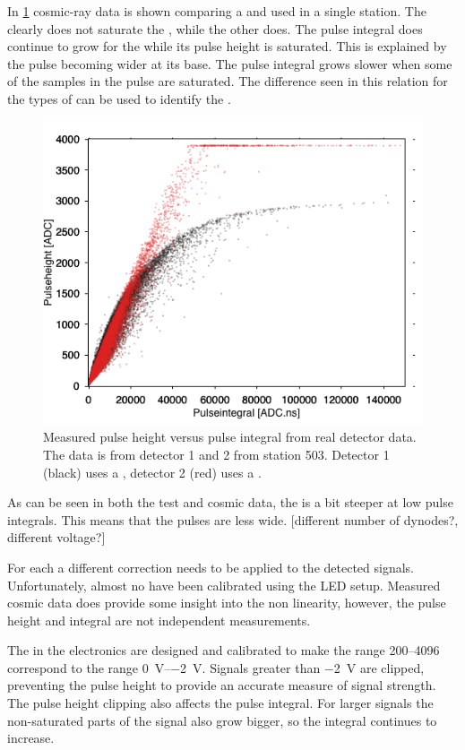 In \cref{fig:ph_pi_503} cosmic-ray data is shown comparing a \nikhef and \senstech \pmt used in a single station. The \senstech \pmt clearly does not saturate the \adcs, while the other does. The pulse integral does continue to grow for the \nikhef \pmt while its pulse height is saturated. This is explained by the pulse becoming wider at its base. The pulse integral grows slower when some of the samples in the pulse are saturated. The difference seen in this relation for the types of \pmts can be used to identify the \pmt.

\begin{figure}
    \centering
    \includegraphics[width=.7\textwidth]{plots/detector/ph_pi_503.png}
    \caption{Measured pulse height versus pulse integral from real detector data. The data is from detector 1 and 2 from station 503. Detector 1 (black) uses a \senstech \pmt, detector 2 (red) uses a \nikhef \pmt.}
    \label{fig:ph_pi_503}
\end{figure}

As can be seen in both the test and cosmic data, the \senstech \pmt is a bit steeper at low pulse integrals. This means that the pulses are less wide. [different number of dynodes?, different voltage?]

For each \senstech \pmt a different correction needs to be applied to the detected signals. Unfortunately, almost no \pmts have been calibrated using the LED setup. Measured cosmic data does provide some insight into the non linearity, however, the pulse height and integral are not independent measurements.

The \adcs in the \hisparc electronics are designed and calibrated to make the range \SIrange{200}{4096}{\adc} correspond to the range \SIrange{0}{-2}{\volt}. Signals greater than \SI{-2}{\volt} are clipped, preventing the pulse height to provide an accurate measure of signal strength. The pulse height clipping also affects the pulse integral. For larger signals the non-saturated parts of the signal also grow bigger, so the integral continues to increase.

